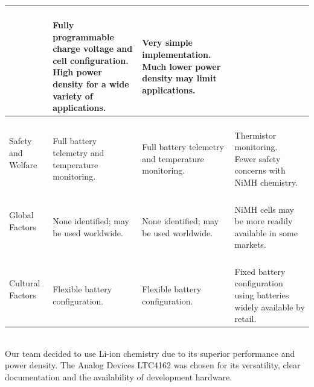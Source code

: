 \documentclass[12pt]{article}
\begin{document}
\begin{table}[h!]
\begin{tabular}{| l | l | l | l |}
{\\} & 
\parbox{0.240\linewidth}{\hfill \\
Fully programmable charge voltage and cell configuration.\\
High power density for a wide variety of applications.
\\} & \parbox{0.240\linewidth}{\hfill \\
Very simple implementation.\\
Much lower power density may limit applications.
\\}\\ \hline
\parbox{0.17\linewidth}{\raggedleft Safety and Welfare} & 
\parbox{0.240\linewidth}{\hfill \\
Full battery telemetry and temperature monitoring.
\\} & 
\parbox{0.240\linewidth}{\hfill \\
Full battery telemetry and temperature monitoring.
\\} & \parbox{0.240\linewidth}{\hfill \\
Thermistor monitoring. \\
Fewer safety concerns with NiMH chemistry. 
\\}\\ \hline
\parbox{0.17\linewidth}{\raggedleft Global Factors} & 
\parbox{0.240\linewidth}{\hfill \\
None identified; may be used worldwide.
\\} & 
\parbox{0.240\linewidth}{\hfill \\
None identified; may be used worldwide.
\\} & \parbox{0.240\linewidth}{\hfill \\
NiMH cells may be more readily available in some markets.
\\}\\ \hline
\parbox{0.17\linewidth}{\raggedleft Cultural Factors} & 
\parbox{0.240\linewidth}{\hfill \\
Flexible battery configuration. 
\\} & 
\parbox{0.240\linewidth}{\hfill \\
Flexible battery configuration. 
\\} & \parbox{0.240\linewidth}{\hfill \\
Fixed battery configuration using batteries widely available by retail.
\\}\\ \hline
\end{tabular}
\end{table}
\pagebreak
\hfill \\
\indent
Our team decided to use Li-ion chemistry due to its superior performance and power density. The Analog Devices LTC4162 was chosen for its versatility, clear documentation and the availability of development hardware.
\end{document}

